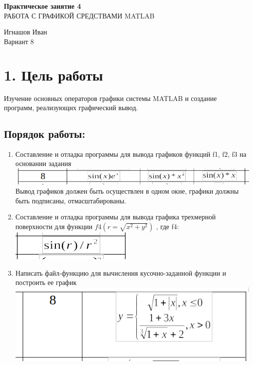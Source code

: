 \documentclass[12pt]{article}
\begin{document}
\begin{center}
	\LARGE 
	\textbf{Практическое занятие 4}\\
	РАБОТА С ГРАФИКОЙ СРЕДСТВАМИ MATLAB\\
\end{center}

\begin{flushright}
	\large
	Игнашов Иван\\
	Вариант 8\\
\end{flushright}

\newpage

 \section*{1. Цель работы}
Изучение основных операторов графики системы MATLAB и создание программ, реализующих графический вывод.
\subsection*{Порядок работы:}
\begin{enumerate}
	\item Составление и отладка программы для вывода графиков функций f1, f2, f3 на основании задания\\
		\includegraphics[width=0.75\linewidth]{formula.png}\\
		Вывод графиков должен быть осуществлен в одном окне, графики должны быть подписаны, отмасштабированы.
		
	\item Составление и отладка программы для вывода графика трехмерной поверхности для функции $f4(r = \sqrt{x^2 + y^2}) $ , где f4:\\
		\includegraphics[width=0.4\linewidth]{formula2.png}
	\item Написать файл-функцию для вычисления кусочно-заданной функции и построить ее график\\
		\includegraphics[width=0.75\linewidth]{formula3.png}
\end{enumerate}
\end{document}
